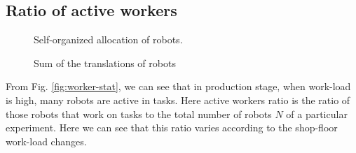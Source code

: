 \documentclass[journal]{IEEEtran}
\begin{document}
\subsection{Ratio of active workers}
\begin{figure}
\begin{minipage}[t]{0.48\linewidth}
\centering
{}
\newline
{}
\newline
{}
\newline
{}
\newline
\caption{Self-organized allocation of robots.} 
\label{fig:worker-stat}
\end{minipage}
\begin{minipage}[t]{0.48\linewidth}
\centering
{}
\newline
{}
\newline
{}
\newline
{}
\newline 
\caption{Sum of the translations of robots}
\label{fig:translation-stat}
\end{minipage}
\end{figure}
From Fig. \ref{fig:worker-stat}, we can  see that in production stage, when work-load is high, many robots are active in tasks. Here active workers ratio is the ratio of those robots that work on tasks to the total number of robots $N$ of a particular experiment.   Here we can see that this ratio varies according to the shop-floor work-load changes.
\end{document}
